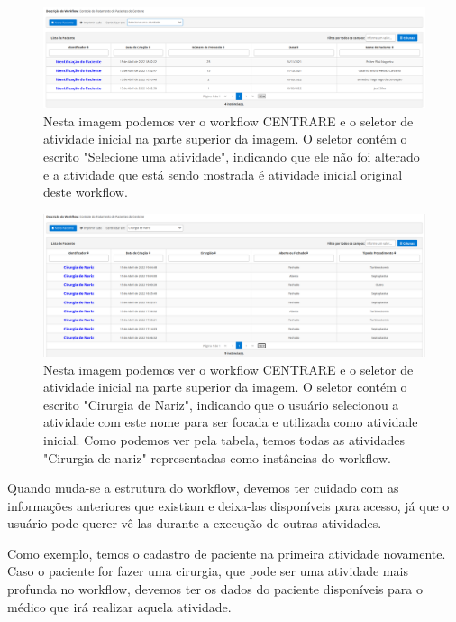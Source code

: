\begin{figure}
    \centering
    \includegraphics[width=1\textwidth]{imgs/CENTRARE/instanciaNormal.png}
    \caption{Nesta imagem podemos ver o workflow CENTRARE e o seletor de atividade inicial na parte superior da imagem. O seletor contém o escrito "Selecione uma atividade", indicando que ele não foi alterado e a atividade que está sendo mostrada é atividade inicial original deste workflow.}
    \label{fig:centrare_seletor_normal}
\end{figure}

\begin{figure}
    \centering
    \includegraphics[width=1\textwidth]{imgs/CENTRARE/instanciaAlterada.png}
    \caption{Nesta imagem podemos ver o workflow CENTRARE e o seletor de atividade inicial na parte superior da imagem. O seletor contém o escrito "Cirurgia de Nariz", indicando que o usuário selecionou a atividade com este nome para ser focada e utilizada como atividade inicial. Como podemos ver pela tabela, temos todas as atividades "Cirurgia de nariz" representadas como instâncias do workflow.}
    \label{fig:centrare_seletor_alterado}
\end{figure}

Quando muda-se a estrutura do workflow, devemos ter cuidado com as informações anteriores que existiam e deixa-las disponíveis para acesso, já que o usuário pode querer vê-las durante a execução de outras atividades.

Como exemplo, temos o cadastro de paciente na primeira atividade novamente. Caso o paciente for fazer uma cirurgia, que pode ser uma atividade mais profunda no workflow, devemos ter os dados do paciente disponíveis para o médico que irá realizar aquela atividade.

